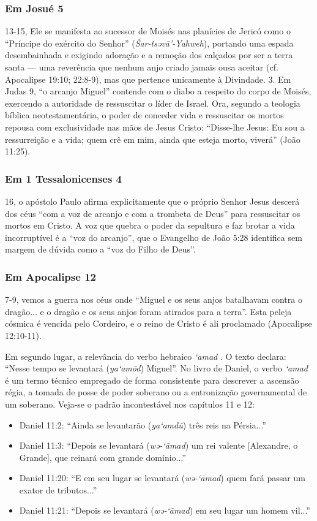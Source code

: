 \documentclass[11pt,a4paper,openany]{book}
\begin{document}
\subsubsection*{Em Josué 5}
13-15, Ele se manifesta ao sucessor de Moisés nas planícies de Jericó como o ``Príncipe do exército do Senhor'' (\textit{Śar-tsəvā’-Yahweh}), portando uma espada desembainhada e exigindo adoração e a remoção dos calçados por ser a terra santa — uma reverência que nenhum anjo criado jamais ousa aceitar (cf. Apocalipse 19:10; 22:8-9), mas que pertence unicamente à Divindade.
3. Em Judas 9, ``o arcanjo Miguel'' contende com o diabo a respeito do corpo de Moisés, exercendo a autoridade de ressuscitar o líder de Israel. Ora, segundo a teologia bíblica neotestamentária, o poder de conceder vida e ressuscitar os mortos repousa com exclusividade nas mãos de Jesus Cristo: ``Disse-lhe Jesus: Eu sou a ressurreição e a vida; quem crê em mim, ainda que esteja morto, viverá'' (João 11:25).

\subsubsection*{Em 1 Tessalonicenses 4}
16, o apóstolo Paulo afirma explicitamente que o próprio Senhor Jesus descerá dos céus ``com a voz de arcanjo e com a trombeta de Deus'' para ressuscitar os mortos em Cristo. A voz que quebra o poder da sepultura e faz brotar a vida incorruptível é a ``voz do arcanjo'', que o Evangelho de João 5:28 identifica sem margem de dúvida como a ``voz do Filho de Deus''.

\subsubsection*{Em Apocalipse 12}
7-9, vemos a guerra nos céus onde ``Miguel e os seus anjos batalhavam contra o dragão... e o dragão e os seus anjos foram atirados para a terra''. Esta peleja cósmica é vencida pelo Cordeiro, e o reino de Cristo é ali proclamado (Apocalipse 12:10-11).

Em segundo lugar, a relevância do verbo hebraico \textit{‘amad} . O texto declara: ``Nesse tempo se levantará (\textit{ya‘amōd}) Miguel''. No livro de Daniel, o verbo \textit{‘amad} é um termo técnico empregado de forma consistente para descrever a ascensão régia, a tomada de posse de poder soberano ou a entronização governamental de um soberano. Veja-se o padrão incontestável nos capítulos 11 e 12:
\begin{itemize}
  \item Daniel 11:2: ``Ainda se levantarão (\textit{ya‘amdû}) três reis na Pérsia...''
  \item Daniel 11:3: ``Depois se levantará (\textit{wə-‘āmad}) um rei valente [Alexandre, o Grande], que reinará com grande domínio...''
  \item Daniel 11:20: ``E em seu lugar se levantará (\textit{wə-‘āmad}) quem fará passar um exator de tributos...''
  \item Daniel 11:21: ``Depois se levantará (\textit{wə-‘āmad}) em seu lugar um homem vil...''
\end{itemize}
\end{document}
